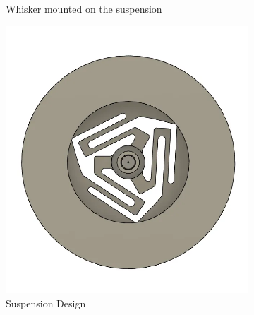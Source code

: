 \begin{figure}[ht]
\begin{subfigure}{0.31\textwidth}
        \caption{Whisker mounted on the suspension} \label{fig:whisker}
    \end{subfigure}%
    \hspace*{\fill}   %
    \begin{subfigure}{0.31\textwidth}
        \centering
        \includegraphics[width=\linewidth]{figures/suspension}
        \caption{Suspension Design} \label{fig:suspension}
    \end{subfigure}%
    \hspace*{\fill}   %
    \begin{subfigure}{0.31\textwidth}
        \centering

\end{subfigure}
\end{figure}
